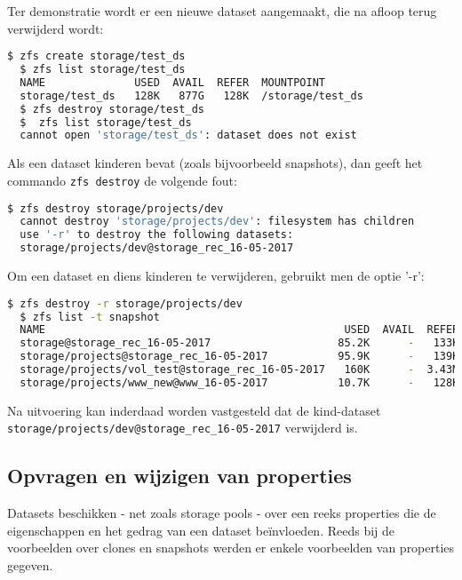 Ter demonstratie wordt er een nieuwe dataset aangemaakt, die na afloop terug verwijderd wordt:

\begin{lstlisting}[language=bash,style=command_style] 
  $ zfs create storage/test_ds
  $ zfs list storage/test_ds
  NAME              USED  AVAIL  REFER  MOUNTPOINT
  storage/test_ds   128K   877G   128K  /storage/test_ds
  $ zfs destroy storage/test_ds
  $  zfs list storage/test_ds
  cannot open 'storage/test_ds': dataset does not exist
\end{lstlisting}

Als een dataset kinderen bevat (zoals bijvoorbeeld snapshots), dan geeft het commando \texttt{zfs destroy} de volgende fout:

\begin{lstlisting}[language=bash,style=command_style] 
  $ zfs destroy storage/projects/dev
  cannot destroy 'storage/projects/dev': filesystem has children
  use '-r' to destroy the following datasets:
  storage/projects/dev@storage_rec_16-05-2017
\end{lstlisting}

\clearpage

Om een dataset en diens kinderen te verwijderen, gebruikt men de optie '-r':

\begin{lstlisting}[language=bash,style=command_style] 
  $ zfs destroy -r storage/projects/dev
  $ zfs list -t snapshot
  NAME                                               USED  AVAIL  REFER  MOUNTPOINT
  storage@storage_rec_16-05-2017                    85.2K      -   133K  -
  storage/projects@storage_rec_16-05-2017           95.9K      -   139K  -
  storage/projects/vol_test@storage_rec_16-05-2017   160K      -  3.43M  -
  storage/projects/www_new@www_16-05-2017           10.7K      -   128K  -
\end{lstlisting}

Na uitvoering kan inderdaad worden vastgesteld dat de kind-dataset \texttt{storage/projects/dev@storage\_rec\_16-05-2017} verwijderd is.

\subsection{Opvragen en wijzigen van properties}

Datasets beschikken - net zoals storage pools - over een reeks properties die de eigenschappen en het gedrag van een dataset beïnvloeden. Reeds bij de voorbeelden over clones en snapshots werden er enkele voorbeelden van properties gegeven. 

